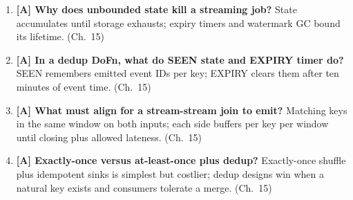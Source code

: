 \begin{enumerate}
    time $t$ believed seen; late data arrives behind it. (Ch.~15)
    \item \textbf{[A] Why does unbounded state kill a streaming job?} State accumulates until
    storage exhausts; expiry timers and watermark GC bound its lifetime. (Ch.~15)
    \item \textbf{[A] In a dedup DoFn, what do SEEN state and EXPIRY timer do?} SEEN remembers
    emitted event IDs per key; EXPIRY clears them after ten minutes of event time. (Ch.~15)
    \item \textbf{[A] What must align for a stream-stream join to emit?} Matching keys in the same
    window on both inputs; each side buffers per key per window until closing plus allowed
    lateness. (Ch.~15)
    \item \textbf{[A] Exactly-once versus at-least-once plus dedup?} Exactly-once shuffle plus
    idempotent sinks is simplest but costlier; dedup designs win when a natural key exists and
    consumers tolerate a merge. (Ch.~15)
\end{enumerate}

